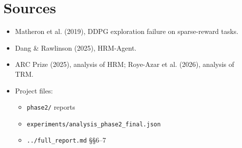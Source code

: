 \documentclass[11pt]{article}
\begin{document}
\section*{Sources}



\begin{itemize}
\item Matheron et al. (2019), DDPG exploration failure on sparse-reward tasks.
\item Dang \& Rawlinson (2025), HRM-Agent.
\item ARC Prize (2025), analysis of HRM; Roye-Azar et al. (2026), analysis of TRM.
\item Project files:
\begin{itemize}
\item \texttt{phase2/} reports
\item \texttt{experiments/\allowbreak{}analysis\_\allowbreak{}phase2\_\allowbreak{}final.\allowbreak{}json}
\item \texttt{.\allowbreak{}.\allowbreak{}/\allowbreak{}full\_\allowbreak{}report.\allowbreak{}md} \S{}\S{}6--7
\end{itemize}
\end{itemize}
\end{document}
